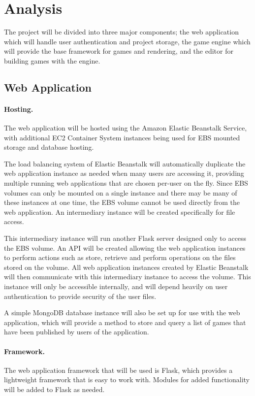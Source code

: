 \documentclass[a4paper, 12pt]{article}
\begin{document}
{}


\section{Analysis}

The project will be divided into three major components; the web application which will handle user authentication and project storage, the game engine which will provide the base framework for games and rendering, and the editor for building games with the engine.

\subsection{Web Application}
\paragraph{Hosting.}
The web application will be hosted using the Amazon Elastic Beanstalk Service, with additional EC2 Container System instances being used for EBS mounted storage and database hosting.

The load balancing system of Elastic Beanstalk will automatically duplicate the web application instance as needed when many users are accessing it, providing multiple running web applications that are chosen per-user on the fly. Since EBS volumes can only be mounted on a single instance and there may be many of these instances at one time, the EBS volume cannot be used directly from the web application. An intermediary instance will be created specifically for file access. 

This intermediary instance will run another Flask server designed only to access the EBS volume. An API will be created allowing the web application instances to perform actions such as store, retrieve and perform operations on the files stored on the volume. All web application instances created by Elastic Beanstalk will then communicate with this intermediary instance to access the volume. This instance will only be accessible internally, and will depend heavily on user authentication to provide security of the user files.

A simple MongoDB database instance will also be set up for use with the web application, which will provide a method to store and query a list of games that have been published by users of the application.

\paragraph{Framework.}
The web application framework that will be used is Flask, which provides a lightweight framework that is easy to work with. Modules for added functionality will be added to Flask as needed.
\end{document}
